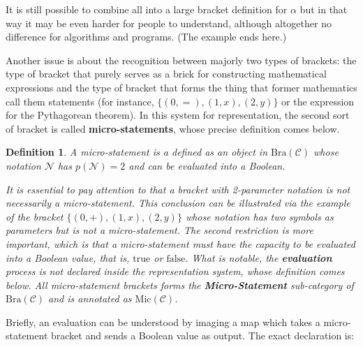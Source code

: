 \documentclass{aims}
\numberwithin{equation}{section}
\newtheorem{definition}{Definition}	%
\numberwithin{theorem}{section}	%
\numberwithin{axiom}{section}	%
\numberwithin{definition}{section}	%
\begin{document}
	It is still possible to combine all into a large bracket definition for \(\alpha\) but in that way it may be even harder for people to understand, although altogether no difference for algorithms and programs. (The example ends here.)
	
	Another issue is about the recognition between majorly two types of brackets: the type of bracket that purely serves as a brick for constructing mathematical expressions and the type of bracket that forms the thing that former mathematics call them statements (for instance, \(\{(0,=),(1,x),(2,y)\}\) or the expression for the Pythagorean theorem). In this system for representation, the second sort of bracket is called \textbf{ micro-statements}, whose precise definition comes below.
	
	\begin{definition}
		A micro-statement is a defined as an object in \(\text{Bra}(\mathcal{C})\) whose notation \(\mathcal{N}\) has \(\mathit{p}(\mathcal{N})=2\) and can be evaluated into a Boolean.
		
		It is essential to pay attention to that a bracket with 2-parameter notation is not necessarily a micro-statement. This conclusion can be illustrated via the example of the bracket  \(\{(0,+),(1,x),(2,y)\}\) whose notation has two symbols as parameters but is not a micro-statement. The second restriction is more important, which is that a micro-statement must have the capacity to be evaluated into a Boolean value, that is, \(\text{true}\) or \(\text{false}\). What is notable, the \textbf{ evaluation} process is not declared inside the representation system, whose definition comes below. All micro-statement brackets forms the \textbf{ Micro-Statement }sub-category of \(\text{Bra}(\mathcal{C})\) and is annotated as \(\text{Mic}(\mathcal{C})\).
	\end{definition}
	
	Briefly, an evaluation can be understood by imaging a map which takes a micro-statement bracket and sends a Boolean value as output. The exact declaration is:
	
\end{document}
